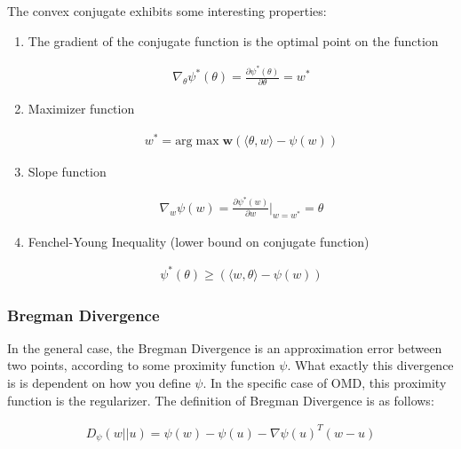 \documentclass[11pt]{article}
\begin{document}
The convex conjugate exhibits some interesting properties:
\begin{enumerate}
    \item The gradient of the conjugate function is the optimal point on the function
    
    \begin{align}
    \label{eq:9}
        \nabla_\theta \psi^*(\theta) = \frac{\partial \psi^*(\theta)}{\partial \theta} = w^*
    \end{align}
    
    \item Maximizer function
    
    \begin{align}
    \label{eq:10}
        w^* = \text{arg} \max\limits{\textbf{w}} (\langle \theta, w \rangle - \psi(w))
    \end{align}
    
    \item Slope function
    
    \begin{align}
    \label{eq:11}
        \nabla_w \psi(w) = \frac{\partial \psi^*(w)}{\partial w}|_{w=w^*} = \theta
    \end{align}
    
    
    \item Fenchel-Young Inequality (lower bound on conjugate function)
    
    \begin{align}
    \label{eq:12}
        \psi^* (\theta) \geq (\langle w, \theta \rangle - \psi(w))
    \end{align}
    
 
\end{enumerate}


\subsubsection{Bregman Divergence}
In the general case, the Bregman Divergence is an approximation error between two points, according to some proximity function $\psi$. What exactly this divergence is is dependent on how you define $\psi$. In the specific case of OMD, this proximity function is the regularizer. The definition of Bregman Divergence is as follows:

\begin{align}
\label{eq:13}
    D_{\psi}(w||u) = \psi(w) - \psi(u) - \nabla \psi(u)^T(w-u)
\end{align}
\end{document}
